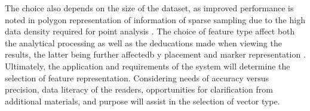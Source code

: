 The choice also depends on the size of the dataset, as improved performance is noted in polygon representation of information of sparse sampling due to the high data density required for point analysis \cite{Acedo2019}. %
The choice of feature type affect both the analytical processing as well as the deducations made when viewing the results, the latter being further affectedb y placement and marker representation \cite{Brown2012}. %
Ultimately, the application and requirements of the system will determine the selection of feature representation. Considering needs of accuracy versus precision, data literacy of the readers, opportunities for clarification from additional materials, and purpose will assist in the selection of vector type. %


